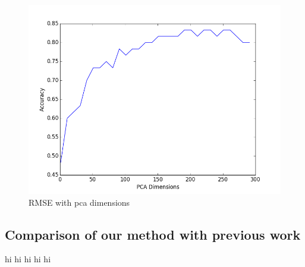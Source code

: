 \documentclass{article} %
\begin{document}
\begin{figure}[h]
\begin{center}
\includegraphics[scale=0.5]{accuracy_2of2.png}
\end{center}
\caption{RMSE with pca dimensions}
\end{figure}




\subsection{Comparison of our method with previous work}

hi hi hi hi hi



\end{document}
